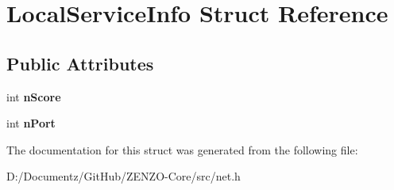 \hypertarget{struct_local_service_info}{}\section{Local\+Service\+Info Struct Reference}
\label{struct_local_service_info}
\subsection*{Public Attributes}
\begin{DoxyCompactItemize}
\item 
\mbox{\label{struct_local_service_info_ad6a9d404fb109ba1506df3f6ca842ed5}} 
int {\bfseries n\+Score}
\item 
\mbox{\label{struct_local_service_info_aa5c39fec8cc69a43e393bb158f69224b}} 
int {\bfseries n\+Port}
\end{DoxyCompactItemize}


The documentation for this struct was generated from the following file\+:\begin{DoxyCompactItemize}
\item 
D\+:/\+Documentz/\+Git\+Hub/\+Z\+E\+N\+Z\+O-\/\+Core/src/net.\+h\end{DoxyCompactItemize}
